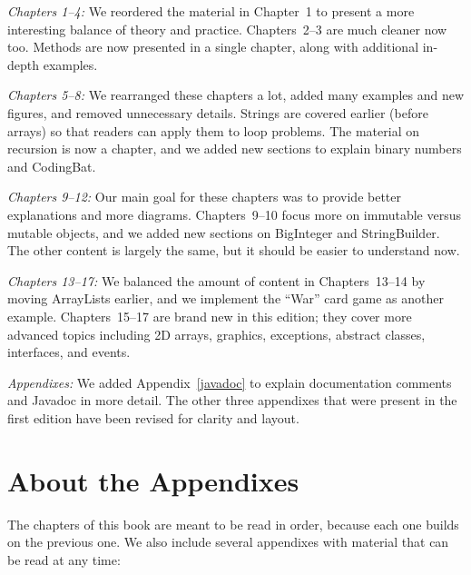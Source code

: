 \begin{description}

\item {\em Chapters 1--4:}
We reordered the material in Chapter~1 to present a more interesting balance of theory and practice.
Chapters~2--3 are much cleaner now too.
Methods are now presented in a single chapter, along with additional in-depth examples.

\item {\em Chapters 5--8:}
We rearranged these chapters a lot, added many examples and new figures, and removed unnecessary details.
Strings are covered earlier (before arrays) so that readers can apply them to loop problems.
The material on recursion is now a chapter, and we added new sections to explain binary numbers and CodingBat.

\item {\em Chapters 9--12:}
Our main goal for these chapters was to provide better explanations and more diagrams.
Chapters~9--10 focus more on immutable versus mutable objects, and we added new sections on BigInteger and StringBuilder.
The other content is largely the same, but it should be easier to understand now.

\item {\em Chapters 13--17:}
We balanced the amount of content in Chapters~13--14 by moving ArrayLists earlier, and we implement the ``War'' card game as another example.
Chapters~15--17 are brand new in this edition; they cover more advanced topics including 2D arrays, graphics, exceptions, abstract classes, interfaces, and events.

\item {\em Appendixes:}
We added Appendix~\ref{javadoc} to explain documentation comments and Javadoc in more detail. %
The other three appendixes that were present in the first edition have been revised for clarity and layout.

\end{description}


\section*{About the Appendixes}

The chapters of this book are meant to be read in order, because each one builds on the previous one.
We also include several appendixes with material that can be read at any time:

